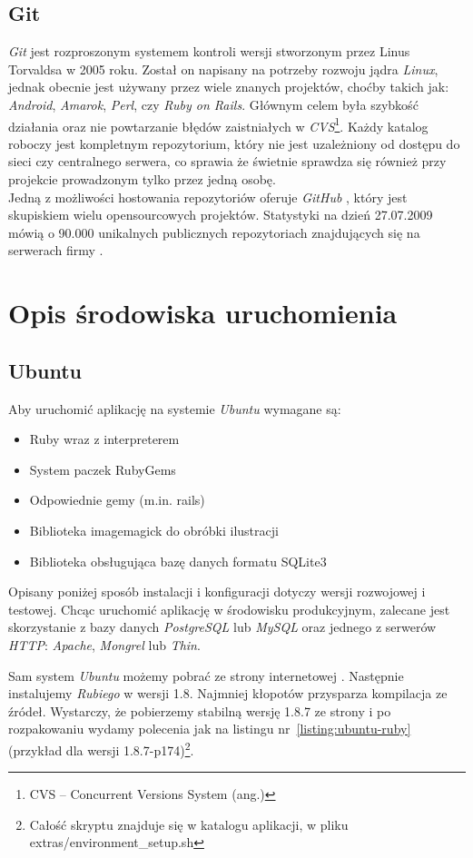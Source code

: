 \documentclass[12pt,twoside]{report}
\begin{document}
\section{Git}
\emph{Git} jest rozproszonym systemem kontroli wersji stworzonym przez Linus Torvaldsa w 2005 roku.
Został on napisany na potrzeby rozwoju jądra \emph{Linux}, jednak obecnie jest używany
przez wiele znanych projektów, choćby takich jak: \emph{Android}, \emph{Amarok}, \emph{Perl},
czy \emph{Ruby on Rails}. Głównym celem była szybkość działania oraz nie powtarzanie błędów
zaistniałych w \emph{CVS}\footnote{CVS -- Concurrent Versions System (ang.)}.
Każdy katalog roboczy jest kompletnym repozytorium, który nie jest uzależniony od dostępu
do sieci czy centralnego serwera, co sprawia że świetnie sprawdza się również przy projekcie
prowadzonym tylko przez jedną osobę.\\
Jedną z możliwości hostowania repozytoriów oferuje \emph{GitHub} \cite{github}, który jest
skupiskiem wielu opensourcowych projektów. Statystyki na dzień 27.07.2009 mówią o 90.000
unikalnych publicznych repozytoriach znajdujących się na serwerach firmy \cite{github-statistics}.


\cleardoublepage
\chapter{Opis środowiska uruchomienia}
\section{Ubuntu}
Aby uruchomić aplikację na systemie \emph{Ubuntu} wymagane są:
\begin{itemize}
  \item{Ruby wraz z interpreterem}
  \item{System paczek RubyGems}
  \item{Odpowiednie gemy (m.in. rails)}
  \item{Biblioteka imagemagick do obróbki ilustracji}
  \item{Biblioteka obsługująca bazę danych formatu SQLite3}
\end{itemize}


Opisany poniżej sposób instalacji i konfiguracji dotyczy wersji rozwojowej i testowej.
Chcąc uruchomić aplikację w środowisku produkcyjnym, zalecane jest skorzystanie z bazy
danych \emph{PostgreSQL} lub \emph{MySQL} oraz jednego z serwerów \emph{HTTP}:
\emph{Apache}, \emph{Mongrel} lub \emph{Thin}.


Sam system \emph{Ubuntu} możemy pobrać ze strony internetowej \cite{ubuntu}.
Następnie instalujemy \emph{Rubiego} w wersji 1.8. Najmniej kłopotów przysparza kompilacja ze
źródeł. Wystarczy, że pobierzemy stabilną wersję 1.8.7 ze strony \cite{ruby-package} i po
rozpakowaniu wydamy polecenia jak na listingu nr~\ref{listing:ubuntu-ruby} (przykład dla
wersji 1.8.7-p174)\footnote{Całość skryptu znajduje się w katalogu aplikacji, w pliku
extras/environment\_setup.sh}.
\end{document}
